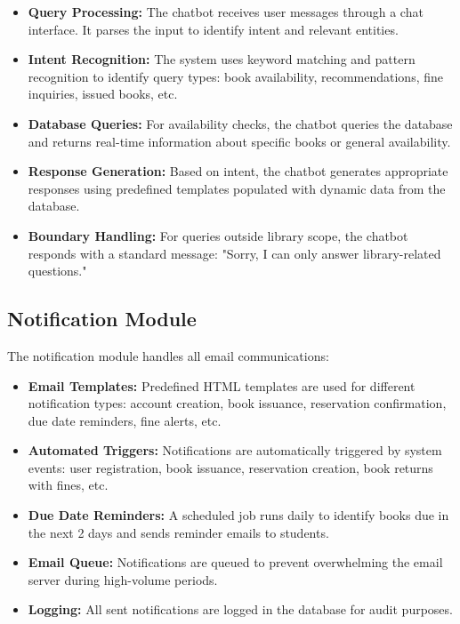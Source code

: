 \documentclass[12pt,a4paper]{report}
\begin{document}
\begin{itemize}
    \item \textbf{Query Processing:} The chatbot receives user messages through a chat interface. It parses the input to identify intent and relevant entities.
    
    \item \textbf{Intent Recognition:} The system uses keyword matching and pattern recognition to identify query types: book availability, recommendations, fine inquiries, issued books, etc.
    
\newpage    
    
    \item \textbf{Database Queries:} For availability checks, the chatbot queries the database and returns real-time information about specific books or general availability.
    
    \item \textbf{Response Generation:} Based on intent, the chatbot generates appropriate responses using predefined templates populated with dynamic data from the database.
    
    \item \textbf{Boundary Handling:} For queries outside library scope, the chatbot responds with a standard message: "Sorry, I can only answer library-related questions."
\end{itemize}

\subsection{Notification Module}

The notification module handles all email communications:

\begin{itemize}
    \item \textbf{Email Templates:} Predefined HTML templates are used for different notification types: account creation, book issuance, reservation confirmation, due date reminders, fine alerts, etc.
    
    \item \textbf{Automated Triggers:} Notifications are automatically triggered by system events: user registration, book issuance, reservation creation, book returns with fines, etc.
    
    \item \textbf{Due Date Reminders:} A scheduled job runs daily to identify books due in the next 2 days and sends reminder emails to students.
    
    \item \textbf{Email Queue:} Notifications are queued to prevent overwhelming the email server during high-volume periods.
    
    \item \textbf{Logging:} All sent notifications are logged in the database for audit purposes.
\end{itemize}
\end{document}
